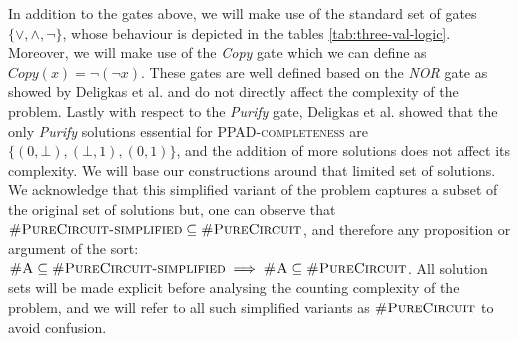 In addition to the gates above, we will make use of the standard set of gates $\{\vee, \wedge, \neg\}$,
whose behaviour is depicted in the tables \ref{tab:three-val-logic}.
Moreover, we will make use of the \textit{Copy} gate which we can define as $\textit{Copy}(x) = \neg (\neg x)$.
These gates are well defined based on the \textit{NOR} gate as showed by Deligkas et al. \cite{deligkas_PureCircuitTightInapproximability_2024}
and do not directly affect the complexity of the problem.
Lastly with respect to the \textit{Purify} gate,
Deligkas et al. \cite{deligkas_PureCircuitTightInapproximability_2024} showed that the only \textit{Purify} solutions essential
for \textsc{PPAD-completeness} are $\{(0,\bot), (\bot,1), (0,1)\}$, and the addition of more solutions does not affect its complexity.
We will base our constructions around that limited set of solutions.
We acknowledge that this simplified variant of the problem captures a subset of the original set of solutions but,
one can observe that $\textsc{\#PureCircuit-simplified} \subseteq \textsc{\#PureCircuit}$,
and therefore any proposition or argument of the sort:
$\textsc{\#A} \subseteq \textsc{\#PureCircuit-simplified} \implies \textsc{\#A} \subseteq \textsc{\#PureCircuit}$.
All solution sets will be made explicit before analysing the counting complexity of the problem,
and we will refer to all such simplified variants as $\textsc{\#PureCircuit}$ to avoid
confusion. 

\begin{table}[h!]
    \centering
 \quad
{}

    \caption{Three-valued logic \cite{kleene_IntroductionMetamathematics_2009}}\label{tab:three-val-logic}
\end{table}

